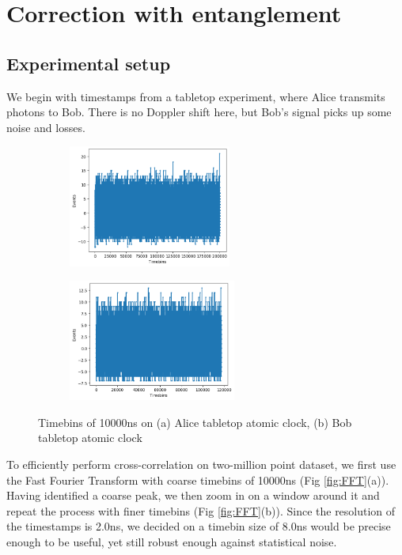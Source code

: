 \section{Correction with entanglement}

\subsection{Experimental setup}
We begin with timestamps from a tabletop experiment, where Alice transmits photons to Bob. There is no Doppler shift here, but Bob's signal picks up some noise and losses.

\begin{figure}[ht!]
	\centering
	\begin{subfigure}[t]{0.49\linewidth}
		\centering
		\includegraphics[height=4cm]{assets/aliceBobTimebinAlice.png}
		\subcaption{}
	\end{subfigure}
	\begin{subfigure}[t]{0.49\textwidth}
		\centering
		\includegraphics[height=4cm]{assets/aliceBobTimebinBob.png}
		\subcaption{}
	\end{subfigure}
	\caption{Timebins of 10000ns on (a) Alice tabletop atomic clock, (b) Bob tabletop atomic clock}
	\label{fig:timebins}
\end{figure}

To efficiently perform cross-correlation on two-million point dataset, we first use the Fast Fourier Transform with coarse timebins of 10000ns (Fig \ref{fig:FFT}(a)). Having identified a coarse peak, we then zoom in on a window around it and repeat the process with finer timebins (Fig \ref{fig:FFT}(b)). Since the resolution of the timestamps is 2.0ns, we decided on a timebin size of 8.0ns would be precise enough to be useful, yet still robust enough against statistical noise.


